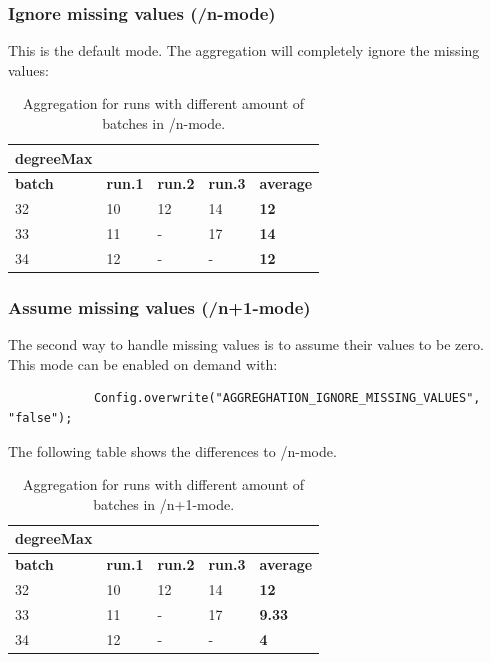 \subsubsection{Ignore missing values (/n-mode)}
This is the default mode. The aggregation will completely ignore the missing values:
\begin{table}[h]
\centering
\begin{tabular}[h]{|l|l|l|l||l|}\hline
	\textbf{degreeMax} & & & &\\
	\hline
	\textbf{batch} & \textbf{run.1} & \textbf{run.2} & \textbf{run.3} & \textbf{average}\\
	\hline
	32 & 10 & 12 & 14 & \textbf{12}\\
	\hline
	33 & 11 & - & 17 & \textbf{14}\\
	\hline
	34 & 12 & - & - & \textbf{12}\\
	\hline
\end{tabular}
\caption{Aggregation for runs with different amount of batches in /n-mode.}
\label{tab:nmode}
\end{table}

\subsubsection{Assume missing values (/n+1-mode)}
The second way to handle missing values is to assume their values to be zero. This mode can be enabled on demand with:
\begin{lstlisting}
			Config.overwrite("AGGREGHATION_IGNORE_MISSING_VALUES", "false");
\end{lstlisting}
The following table shows the differences to /n-mode.
\begin{table}[h]
\centering
\begin{tabular}[h]{|l|l|l|l||l|}\hline
	\textbf{degreeMax} & & & &\\
	\hline
	\textbf{batch} & \textbf{run.1} & \textbf{run.2} & \textbf{run.3} & \textbf{average}\\
	\hline
	32 & 10 & 12 & 14 & \textbf{12}\\
	\hline
	33 & 11 & - & 17 & \textbf{9.33}\\
	\hline
	34 & 12 & - & - & \textbf{4}\\
	\hline
\end{tabular}
\caption{Aggregation for runs with different amount of batches in /n+1-mode.}
\label{tab:nmode}
\end{table}

